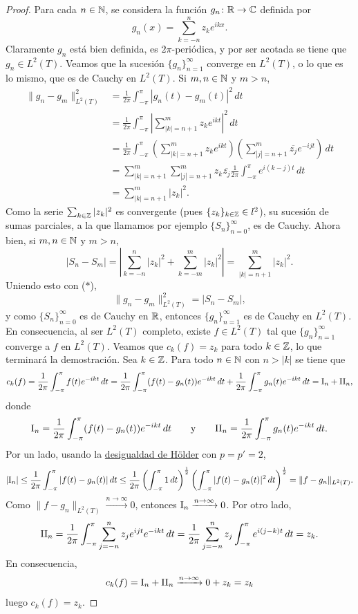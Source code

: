 \documentclass[a4paper, 11pt, oneside]{report}
\begin{document}
\begin{proof}
  Para cada $n \in \mathbb N$, se considera la función $g_n \colon \mathbb R \to \mathbb C$ definida por \[g_n(x)=\sum_{k=-n}^n z_k e^{ikx}.\] Claramente $g_n$ está bien definida, es $2\pi$-periódica, y por ser acotada se tiene que $g_n \in L^2(T)$. Veamos que la sucesión $\{g_n\}_{n=1}^\infty$ converge en $L^2(T)$, o lo que es lo mismo, que es de Cauchy en $L^2(T)$. Si $m,n \in \mathbb N$ y $m > n$,
  \begin{align*}
    \|g_n-g_m\|^2_{L^2(T)} &= \frac{1}{2\pi}\int_{-\pi}^\pi |g_n(t)-g_m(t)|^2 \, dt \\
    &= \frac{1}{2\pi}\int_{-\pi}^\pi \left|\sum_{|k|=n+1}^m z_ke^{ikt}\right|^2 \, dt \\
    &= \frac{1}{2\pi}\int_{-\pi}^\pi \left(\sum_{|k|=n+1}^m z_ke^{ikt}\right)\left(\sum_{|j|=n+1}^m \overline{z_j}e^{-ijt}\right) \, dt \\
    &= \sum_{|k|=n+1}^m \sum_{|j|=n+1}^m z_k\overline{z_j}\frac{1}{2\pi}\int_{-\pi}^\pi  e^{i(k-j)t} \, dt \\
    &= \sum_{|k|=n+1}^m |z_k|^2. \tag{$\ast$}
  \end{align*}
  Como la serie $\sum_{k \in \mathbb Z}|z_k|^2$ es convergente (pues $\{z_k\}_{k \in \mathbb Z} \in l^2$), su sucesión de sumas parciales, a la que llamamos por ejemplo $\{S_n\}_{n=0}^\infty$, es de Cauchy. Ahora bien, si $m,n\in\mathbb N$ y $m > n$,
  \[|S_n-S_m|=\left|\sum_{k=-n}^n |z_k|^2 + \sum_{k=-m}^m |z_k|^2\right| = \sum_{|k|=n+1}^m |z_k|^2.\]
  Uniendo esto con ($\ast$),
  \[\|g_n-g_m\|_{L^2(T)}^2 = |S_n-S_m|,\]
  y como $\{S_n\}_{n=0}^\infty$ es de Cauchy en $\mathbb R$, entonces $\{g_n\}_{n=1}^\infty$ es de Cauchy en $L^2(T)$. En consecuencia, al ser $L^2(T)$ completo, existe $f \in L^2(T)$ tal que $\{g_n\}_{n=1}^\infty$ converge a $f$ en $L^2(T)$. Veamos que $c_k(f) = z_k$ para todo $k \in \mathbb Z$, lo que terminará la demostración. Sea $k \in \mathbb Z$. Para todo $n \in \mathbb N$ con $n > |k|$ se tiene que
  \[c_k(f) = \frac{1}{2\pi}\int_{-\pi}^\pi f(t)e^{-ikt} \, dt = \frac{1}{2\pi}\int_{-\pi}^\pi (f(t)-g_n(t))e^{-ikt} \, dt + \frac{1}{2\pi}\int_{-\pi}^\pi g_n(t) e^{-ikt} \, dt = \textup{I}_n+\textup{II}_n,\]
  donde
  \[\textup{I}_n =  \frac{1}{2\pi}\int_{-\pi}^\pi (f(t)-g_n(t))e^{-ikt} \, dt \qquad \textup{y} \qquad \textup{II}_n = \frac{1}{2\pi}\int_{-\pi}^\pi g_n(t) e^{-ikt} \, dt.  \]
  Por un lado, usando la \hyperref[teo:1.2.6]{\color{c1}desigualdad de Hölder} con $p=p'=2$,
  \begin{align*}
    |\textup{I}_n| \leq \frac{1}{2\pi}\int_{-\pi}^\pi |f(t)-g_n(t)| \, dt 
     \leq \frac{1}{2\pi}\left(\int_{-\pi}^\pi 1 \, dt\right)^{\frac{1}{2}} \left(\int_{-\pi}^\pi |f(t)-g_n(t)|^2 \, dt\right)^{\frac{1}{2}} 
     = \|f-g_n\|_{L^2(T)}.
  \end{align*}
  Como $\|f-g_n\|_{L^2(T)} \xrightarrow{n \to \infty} 0$, entonces $\textup{I}_n\xrightarrow{n \to \infty} 0$. Por otro lado,
  \begin{align*}
    \textup{II}_n = \frac{1}{2\pi}\int_{-\pi}^\pi \sum_{j=-n}^n z_je^{ijt}e^{-ikt} \, dt = \frac{1}{2\pi}\sum_{j=-n}^n z_j\int_{-\pi}^\pi e^{i(j-k)t}\, dt = z_k.
  \end{align*}
  En consecuencia,
  \[c_k(f) = \textup{I}_n + \textup{II}_n \xrightarrow{n \to \infty} 0 + z_k=z_k\]
  luego $c_k(f)=z_k$.
\end{proof}
\end{document}
